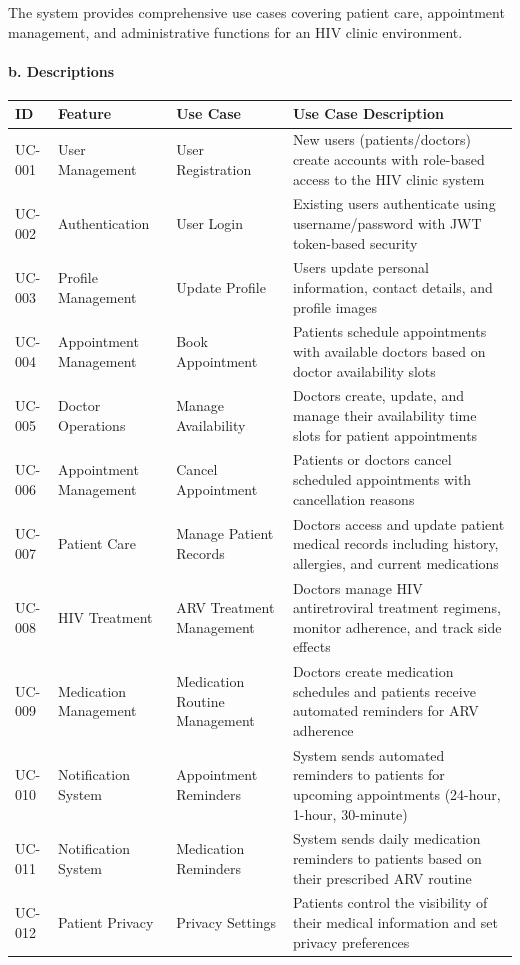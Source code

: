 \documentclass[12pt,a4paper]{article}
\begin{document}
The system provides comprehensive use cases covering patient care, appointment management, and administrative functions for an HIV clinic environment.

\paragraph{b. Descriptions}

\begin{longtable}{|p{1cm}|p{3cm}|p{3cm}|p{7cm}|}
\hline
\textbf{ID} & \textbf{Feature} & \textbf{Use Case} & \textbf{Use Case Description} \\
\hline
UC-001 & User Management & User Registration & New users (patients/doctors) create accounts with role-based access to the HIV clinic system \\
\hline
UC-002 & Authentication & User Login & Existing users authenticate using username/password with JWT token-based security \\
\hline
UC-003 & Profile Management & Update Profile & Users update personal information, contact details, and profile images \\
\hline
UC-004 & Appointment Management & Book Appointment & Patients schedule appointments with available doctors based on doctor availability slots \\
\hline
UC-005 & Doctor Operations & Manage Availability & Doctors create, update, and manage their availability time slots for patient appointments \\
\hline
UC-006 & Appointment Management & Cancel Appointment & Patients or doctors cancel scheduled appointments with cancellation reasons \\
\hline
UC-007 & Patient Care & Manage Patient Records & Doctors access and update patient medical records including history, allergies, and current medications \\
\hline
UC-008 & HIV Treatment & ARV Treatment Management & Doctors manage HIV antiretroviral treatment regimens, monitor adherence, and track side effects \\
\hline
UC-009 & Medication Management & Medication Routine Management & Doctors create medication schedules and patients receive automated reminders for ARV adherence \\
\hline
UC-010 & Notification System & Appointment Reminders & System sends automated reminders to patients for upcoming appointments (24-hour, 1-hour, 30-minute) \\
\hline
UC-011 & Notification System & Medication Reminders & System sends daily medication reminders to patients based on their prescribed ARV routine \\
\hline
UC-012 & Patient Privacy & Privacy Settings & Patients control the visibility of their medical information and set privacy preferences \\
\hline
\end{longtable}
\end{document}
